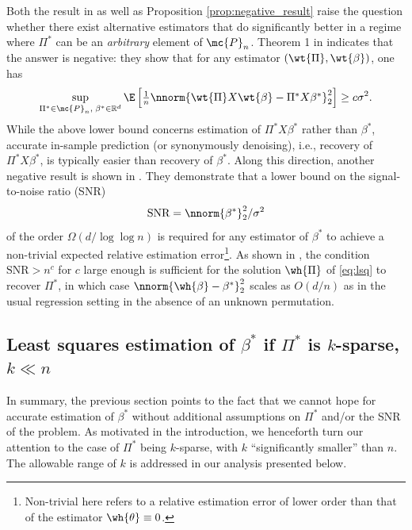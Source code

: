 \documentclass[11pt]{article}
\def\R{\mathbb{R}}
\begin{document}
Both the result in \cite{Abid2017} as well as Proposition \ref{prop:negative_result} raise the question whether there exist alternative estimators that do significantly better in a regime where $\Pi^*$ can be an \emph{arbitrary} element of $\mc{P}_n$. Theorem 1 in \cite{Pananjady2017} indicates that the answer is negative: they show that for any estimator $(\wt{\Pi}, \wt{\beta})$, one has       
\begin{equation*}
\sup_{\Pi^* \in \mc{P}_n, \; \beta^* \in \R^d} \E\left[\textstyle\frac{1}{n} \nnorm{\wt{\Pi} X \wt{\beta} - \Pi^* X  \beta^*}_2^2\right] \geq c \sigma^2. 
\end{equation*}
While the above lower bound concerns estimation of $\Pi^* X  \beta^*$ rather than $\beta^*$, accurate in-sample prediction (or synonymously denoising), i.e., recovery of $\Pi^* X  \beta^*$, is typically easier than recovery of $\beta^*$. Along this direction, another negative result is shown in \cite{Hsu2017}. They demonstrate that a lower bound on the signal-to-noise ratio (SNR)
\begin{equation}\label{eq:snr}
\text{SNR} = \nnorm{\beta^*}_2^2 / \sigma^2
\end{equation}
of the order $\Omega(d / \log \log n)$ is required for any estimator of $\beta^*$ to achieve a non-trivial expected relative estimation error\footnote{Non-trivial here refers to a relative estimation error of lower order than that of the estimator $\wh{\theta} \equiv 0$.}. As shown in \cite{Pananjady2016}, the condition $\text{SNR} > n^c$ for $c$ large enough is sufficient for the solution $\wh{\Pi}$ of \eqref{eq:lsq} to recover $\Pi^*$, in which case 
$\nnorm{\wh{\beta} - \beta^*}_2^2$ scales as $O(d/n)$ as in the usual regression setting in the absence of an unknown permutation.

\subsection{Least squares estimation of $\beta^*$ if $\Pi^*$ is $k$-sparse, $k \ll n$}\label{subsec:sparsePi}
In summary, the previous section points to the fact that we cannot hope for accurate estimation of $\beta^*$ without additional
assumptions on $\Pi^*$ and/or the SNR of the problem. As motivated in the introduction, we henceforth turn our attention to 
the case of $\Pi^*$ being $k$-sparse, with $k$ ``significantly smaller'' than $n$. The allowable range of $k$ is addressed in 
our analysis presented below.       
\end{document}
